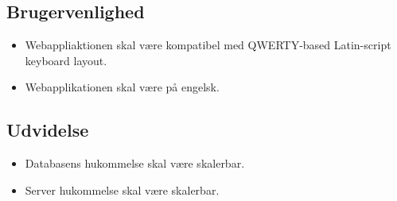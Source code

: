 \noindent 
\subsection{Brugervenlighed}

\begin{itemize}

\item  Webappliaktionen skal v{\ae}re kompatibel med QWERTY-based Latin-script keyboard layout.

\item  Webapplikationen skal v{\ae}re p{\aa} engelsk.
\end{itemize}

\noindent 
\subsection{Udvidelse}

\begin{itemize}
\item  Databasens hukommelse skal v{\ae}re skalerbar.

\item  Server hukommelse skal v{\ae}re skalerbar.

\end{itemize}
